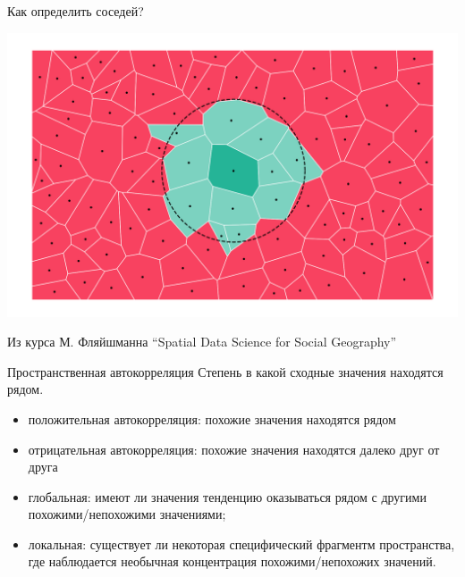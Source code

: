 \documentclass[
  ignorenonframetext,
  t]{beamer}
\providecommand{\tightlist}{%
  \setlength{\itemsep}{0pt}\setlength{\parskip}{0pt}}\usepackage{longtable,booktabs,array}
\begin{document}
\begin{frame}{Как определить соседей?}
\label{ux43aux430ux43a-ux43eux43fux440ux435ux434ux435ux43bux438ux442ux44c-ux441ux43eux441ux435ux434ux435ux439-2}
\begin{center}
\includegraphics[width=1\linewidth,height=\textheight,keepaspectratio]{images/06-neighbour.png}
\end{center}

Из курса М. Фляйшманна ``Spatial Data Science for Social Geography''
\end{frame}

\begin{frame}{Пространственная автокорреляция}
\label{ux43fux440ux43eux441ux442ux440ux430ux43dux441ux442ux432ux435ux43dux43dux430ux44f-ux430ux432ux442ux43eux43aux43eux440ux440ux435ux43bux44fux446ux438ux44f}
Степень в какой сходные значения находятся рядом.

\begin{itemize}
\tightlist
\item
  положительная автокорреляция: похожие значения находятся рядом
\item
  отрицательная автокорреляция: похожие значения находятся далеко друг
  от друга
\end{itemize}

\pause

\begin{itemize}
\tightlist
\item
  глобальная: имеют ли значения тенденцию оказываться рядом с другими
  похожими/непохожими значениями;
\item
  локальная: существует ли некоторая специфический фрагментм
  пространства, где наблюдается необычная концентрация
  похожими/непохожих значений.
\end{itemize}
\end{frame}
\end{document}
